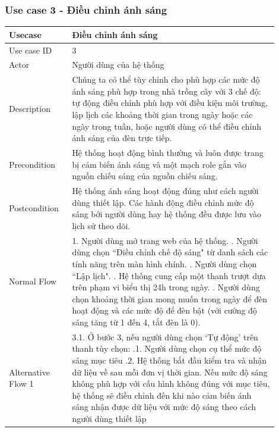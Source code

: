 \subsubsection{Use case 3 - Điều chỉnh ánh sáng}
\renewcommand{\arraystretch}{1.6}
\begin{table}[H]
\centering
\begin{tabular}{|p{0.2\linewidth}|p{0.7\linewidth}|}
\hline
\rowcolor[HTML]{EFEFEF} 
\textbf{Usecase}        & \textbf{Điều chỉnh ánh sáng} \\ \hline
Use case ID             & 3 \\ \hline
Actor                   & Người dùng của hệ thống \\ \hline
Description             & Chúng ta có thể tùy chỉnh cho phù hợp các mức độ ánh sáng phù hợp trong nhà trồng cây với 3 chế độ: tự động điều chỉnh phù hợp với điều kiện môi trường, lập lịch các khoảng thời gian trong ngày hoặc các ngày trong tuần, hoặc người dùng có thể điều chỉnh ánh sáng của đèn trực tiếp. \\ \hline
Precondition            & Hệ thống hoạt động bình thường và luôn được trang bị cảm biến ánh sáng và một mạch role gắn vào nguồn chiếu sáng của nguồn chiếu sáng. \\ \hline
Postcondition           & Hệ thống ánh sáng hoạt động đúng như cách người dùng thiết lập. Các hành động điều chỉnh mức độ sáng bởi người dùng hay hệ thống đều được lưu vào lịch sử theo dõi. \\ \hline
Normal Flow             & 
    1. Người dùng mở trang web của hệ thống. \newline
    2. Người dùng chọn ``Điều chỉnh chế độ sáng" từ danh sách các tính năng trên màn hình chính. \newline
    3. Người dùng chọn ``Lập lịch". \newline
    4. Hệ thống cung cấp một thanh trượt dựa trên phạm vi biểu thị 24h trong ngày. \newline
    5. Người dùng chọn khoảng thời gian mong muốn trong ngày để đèn hoạt động và các mức độ để đèn bật (với cường độ sáng tăng từ 1 đến 4, tắt đèn là 0). 
\\ \hline
Alternative Flow 1          & 
    3.1. Ở bước 3, nếu người dùng chọn `Tự động' trên thanh tùy chọn: \newline
    3.1.1. Người dùng chọn cụ thể mức độ sáng mục tiêu \newline
    3.1.2. Hệ thống bắt đầu kiểm tra và nhận dữ liệu về sau mỗi đơn vị thời gian. Nếu mức độ sáng không phù hợp với cấu hình không đúng với mục tiêu, hệ thống sẽ điều chỉnh đến khi nào cảm biến ánh sáng nhận được dữ liệu với mức độ sáng theo cách người dùng thiết lập  \\ \hline

\end{tabular}
\end{table}
